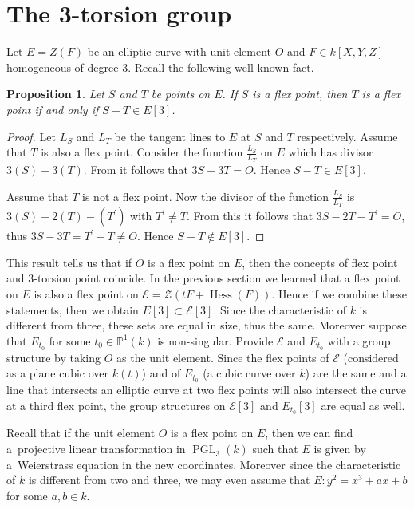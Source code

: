 \documentclass[pdftex]{sigma}
\newcommand{\mpp}{{\mathbb{P}}}
\newcommand{\msetp}[1]{{\left({#1}\right)}}					%
\newcommand{\msets}[1]{{\left[{#1}\right]}}					%
\newcommand{\mhess}[1]{\operatorname{Hess}\msetp{#1}}			%
\newcommand{\mpgl}[2]{{\operatorname{PGL}_{#1}}\msetp{#2}}	%
\newcommand{\mps}[2]{{\mpp^{#1}\msetp{#2}}}						%
\numberwithin{equation}{section}
\newtheorem{Proposition}[Theorem]{Proposition}
\begin{document}
\section{The 3-torsion group}\label{hpga:sec:3tgrp}

Let $E=Z\msetp{F}$ be an elliptic curve with unit element $O$ and $F\in k\msets {X,Y,Z}$ homogeneous of degree 3. Recall the following well known fact.

\begin{Proposition}Let $S$ and $T$ be points on $E$. If $S$ is a flex point, then $T$ is a flex point if and only if $S-T\in E\msets{3}$.
\end{Proposition}
\begin{proof}Let $L_S$ and $L_T$ be the tangent lines to $E$ at $S$ and $T$ respectively. Assume that $T$ is also a flex point. Consider the function $\frac{L_S}{L_T}$ on $E$ which has divisor $3\msetp{S}-3\msetp{T}$. From \cite[Corollary~III.3.5]{silverman1985} it follows that $3S-3T=O$. Hence $S-T\in E\msets{3}$.

Assume that $T$ is not a flex point. Now the divisor of the function $\frac {L_S}{L_T}$ is $3\msetp{S}-2\msetp{T}-\msetp{T^\prime}$ with $T^\prime\neq T$. From this it follows that $3S-2T-T^\prime=O$, thus $3S-3T=T^\prime-T\neq O$. Hence $S-T\notin E\msets{3}$.
\end{proof}

This result tells us that if $O$ is a flex point on $E$, then the concepts of flex point and 3-torsion point coincide. In the previous section we learned that a flex point on $E$ is also a flex point on $\mathcal{E}=\mathcal{Z}(tF+\mhess{F})$. Hence if we combine these statements, then we obtain $E\msets{3}\subset\mathcal{E}\msets{3}$. Since the characteristic of $k$ is different from three, these sets are equal in size, thus the same. Moreover suppose that $E_{t_0}$ for some $t_0\in\mps{1}{k}$ is non-singular. Provide $\mathcal{E}$ and $E_{t_0}$ with a group structure by taking $O$ as the unit element. Since the flex points of $\mathcal{E}$ (considered as a plane cubic over $k(t)$) and of $E_{t_0}$ (a cubic curve over $k$) are the same and a line that intersects an elliptic curve at two flex points will also intersect the curve at a third flex point, the group structures on $\mathcal{E}\msets{3}$ and $E_{t_0}\msets{3}$ are equal as well.

Recall that if the unit element $O$ is a flex point on $E$, then we can find a~projective linear transformation in $\mpgl{3}{k}$ such that $E$ is given by a~Weierstrass equation in the new coordinates. Moreover since the characteristic of $k$ is different from two and three, we may even assume that $E\colon y^2=x^3+ax+b$ for some $a,b\in k$.
\end{document}
